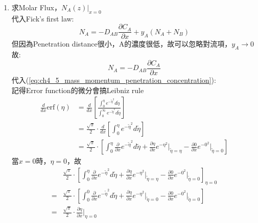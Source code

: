 \documentclass[../main.tex]{subfiles}
\begin{document}
\begin{itemize}
\begin{enumerate}
\begin{equation}
      C_A(x,z) = C_{A0} \text{erfc}\left(
        \frac{x}{2\sqrt{\frac{D_{AB}}{u_{\text{max}}}z}}
      \right) \label{eq:ch4_5_mass_momentum_penetration_concentration}
    \end{equation}
    為濃度分佈式
    \item 求Molar Flux，$N_A(z)\big|_{x=0}$\\
    代入Fick's first law:
    \begin{equation}
      N_A = -D_{AB}\frac{\partial C_A}{\partial x} + y_A(N_A+N_B)
    \end{equation}
    但因為Penetration distance很小，A的濃度很低，故可以忽略對流項，$y_A\to 0$\\
    故:
    \begin{equation}
      N_A = -D_{AB}\frac{\partial C_A}{\partial x}
    \end{equation}
    代入(\ref{eq:ch4_5_mass_momentum_penetration_concentration}):\\
    記得Error function的微分會搞Leibniz rule
    \begin{align}
      \frac{d}{dx}\text{erf}(\eta) &= \frac{d}{dx}\left[
        \frac{\int_0^\eta e^{-\tilde\eta^2} d\tilde\eta}{\int_0^\infty e^{-\tilde\eta^2} d\tilde\eta}
      \right] \nonumber\\
      &= \frac{\sqrt{\pi}}{2} \cdot \frac{d}{dx}\left[
        \int_0^\eta e^{-\tilde\eta^2} d\tilde\eta
      \right] \nonumber\\
      &= \frac{\sqrt{\pi}}{2} \cdot \left[
        \int_0^\eta \frac{\partial}{\partial x} e^{-\tilde\eta^2} d\tilde\eta + 
        \frac{\partial \eta}{\partial x} e^{-\eta^2}\big|_{\tilde\eta=\eta}
        - \frac{\partial 0}{\partial x} e^{-0^2}\big|_{\tilde\eta=0}
      \right] 
    \end{align}
    當$x=0$時，$\eta=0$，故
    \begin{align}
      &\frac{\sqrt{\pi}}{2} \cdot \left[
        \int_0^\eta \frac{\partial}{\partial x} e^{-\tilde\eta^2} d\tilde\eta + 
        \frac{\partial \eta}{\partial x} e^{-\eta^2}\big|_{\tilde\eta=\eta}
        - \frac{\partial 0}{\partial x} e^{-0^2}\big|_{\tilde\eta=0}
      \right]_{\eta=0} \nonumber\\
      =& \frac{\sqrt{\pi}}{2} \cdot \left[
        \int_0^0 \frac{\partial}{\partial x} e^{-\tilde\eta^2} d\tilde\eta + 
        \frac{\partial \eta}{\partial x} e^{-\eta^2}\big|_{\tilde\eta=0}
        - \frac{\partial 0}{\partial x} e^{-0^2}\big|_{\tilde\eta=0}
      \right] \nonumber\\
      =& \frac{\sqrt{\pi}}{2} \cdot \frac{\partial \eta}{\partial x}\bigg|_{\eta=0} \nonumber\\

\end{align}
\end{enumerate}
\end{itemize}
\end{document}
